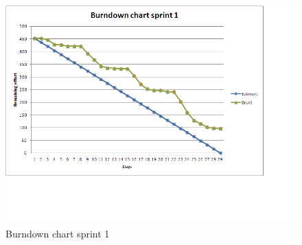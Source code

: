 

\begin{figure}
	\includegraphics[width=\textwidth]{burndown1.png}
	\caption{Burndown chart sprint 1}
	\label{fig:burndown1}
\end{figure}